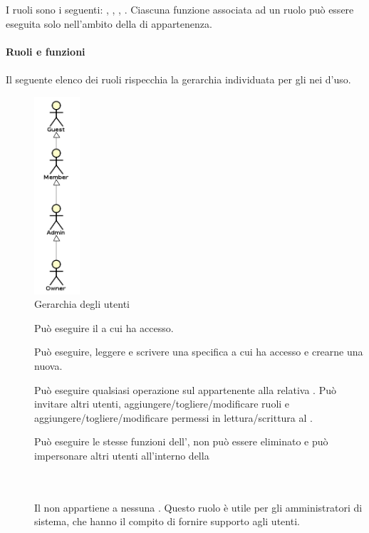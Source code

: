 \begin{description}
	I ruoli sono i seguenti: , , , .	
	Ciascuna funzione associata ad un ruolo pu\`o essere eseguita solo nell'ambito della  di appartenenza. \\\\
	\textbf{Ruoli e funzioni} \hfill \\\\
		Il seguente elenco dei ruoli rispecchia la gerarchia individuata per gli  nei  d'uso.
                 \begin{figure}[H]
                   \begin{center}
                     \includegraphics[width=0.15\textwidth]{res/img/UCUtenti/gerarchia_utenti.png}
                     \caption{Gerarchia degli utenti}
                   \end{center} 
                 \end{figure}  
		\begin{description}
			\item[] Pu\`o eseguire il  a cui ha accesso.
			\item[] Pu\`o eseguire, leggere e scrivere una specifica  a cui ha accesso e crearne una nuova.
			\item[] Pu\`o eseguire qualsiasi operazione sul  appartenente alla relativa . Pu\`o invitare altri utenti, aggiungere/togliere/modificare ruoli e aggiungere/togliere/modificare permessi in lettura/scrittura al .
			\item[] Pu\`o eseguire le stesse funzioni dell', non pu\`o essere eliminato e pu\`o impersonare altri utenti all'interno della 
                        \item[] \hfill \\\\
	Il  non appartiene a nessuna . Questo ruolo \`e utile per gli amministratori di sistema, che hanno il compito di fornire supporto agli utenti.
		\end{description}
\end{description}

\newpage
